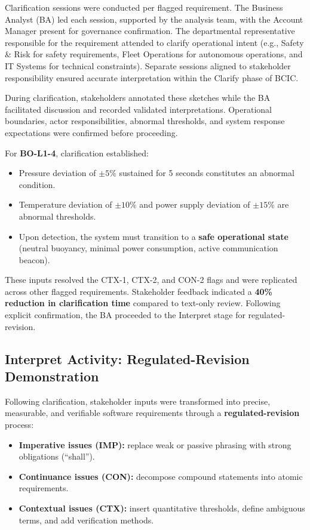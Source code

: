 \documentclass[11pt,a4paper]{article}
\begin{document}
Clarification sessions were conducted per flagged requirement. The Business Analyst (BA) led each session, supported by the analysis team, with the Account Manager present for governance confirmation. The departmental representative responsible for the requirement attended to clarify operational intent (e.g., Safety \& Risk for safety requirements, Fleet Operations for autonomous operations, and IT Systems for technical constraints). Separate sessions aligned to stakeholder responsibility ensured accurate interpretation within the Clarify phase of BCIC.

During clarification, stakeholders annotated these sketches while the BA facilitated discussion and recorded validated interpretations. Operational boundaries, actor responsibilities, abnormal thresholds, and system response expectations were confirmed before proceeding.

For \textbf{BO-L1-4}, clarification established:

\begin{itemize}
    \item Pressure deviation of \(\pm5\%\) sustained for 5 seconds constitutes an abnormal condition.
    \item Temperature deviation of \(\pm10\%\) and power supply deviation of \(\pm15\%\) are abnormal thresholds.
    \item Upon detection, the system must transition to a \textbf{safe operational state} (neutral buoyancy, minimal power consumption, active communication beacon).
\end{itemize}

These inputs resolved the CTX-1, CTX-2, and CON-2 flags and were replicated across other flagged requirements. Stakeholder feedback indicated a \textbf{40\% reduction in clarification time} compared to text-only review. Following explicit confirmation, the BA proceeded to the Interpret stage for regulated-revision.

\subsection{Interpret Activity: Regulated-Revision Demonstration}

Following clarification, stakeholder inputs were transformed into precise, measurable, and verifiable software requirements through a \textbf{regulated-revision} process:

\begin{itemize}
    \item \textbf{Imperative issues (IMP):} replace weak or passive phrasing with strong obligations (“shall”).
    \item \textbf{Continuance issues (CON):} decompose compound statements into atomic requirements.
    \item \textbf{Contextual issues (CTX):} insert quantitative thresholds, define ambiguous terms, and add verification methods.
\end{itemize}
\end{document}
